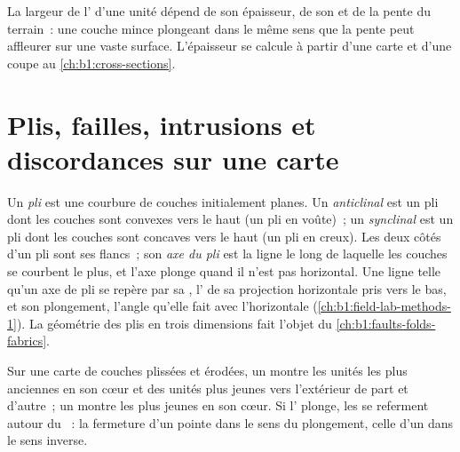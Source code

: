 \begin{remark}\label{rem:b1:geological-maps:width}
La largeur de l' d'une unité dépend de son épaisseur, de son
 et de la pente du terrain~: une couche mince plongeant dans le même sens
que la pente peut affleurer sur une vaste surface. L'épaisseur se calcule à
partir d'une carte et d'une coupe au \cref{ch:b1:cross-sections}.
\end{remark}

\section{Plis, failles, intrusions et discordances sur une carte}

\begin{definition}\label{def:b1:geological-maps:fold}
Un \emph{pli} est une courbure de couches initialement planes. Un
\emph{anticlinal} est un pli dont les couches sont convexes
vers le haut (un pli en voûte)~; un \emph{synclinal} est un pli
dont les couches sont concaves vers le haut (un pli en creux). Les deux côtés
d'un pli sont ses flancs~; son \emph{axe du pli} est la ligne le long de
laquelle les couches se courbent le plus, et l'axe plonge quand il n'est pas
horizontal. Une ligne telle qu'un axe de pli se repère par sa ,
l' de sa projection horizontale pris vers le bas, et son plongement,
l'angle qu'elle fait avec l'horizontale (\cref{ch:b1:field-lab-methods-1}). La
géométrie des plis en trois dimensions fait l'objet du
\cref{ch:b1:faults-folds-fabrics}.
\end{definition}

\begin{proposition}\label{prop:b1:geological-maps:folds}
Sur une carte de couches plissées et érodées, un  montre les unités
les plus anciennes en son cœur et des unités plus jeunes vers l'extérieur de
part et d'autre~; un  montre les plus jeunes en son cœur. Si l' plonge, les  se referment autour du ~: la fermeture d'un
 pointe dans le sens du plongement, celle d'un  dans le sens
inverse.
\end{proposition}

